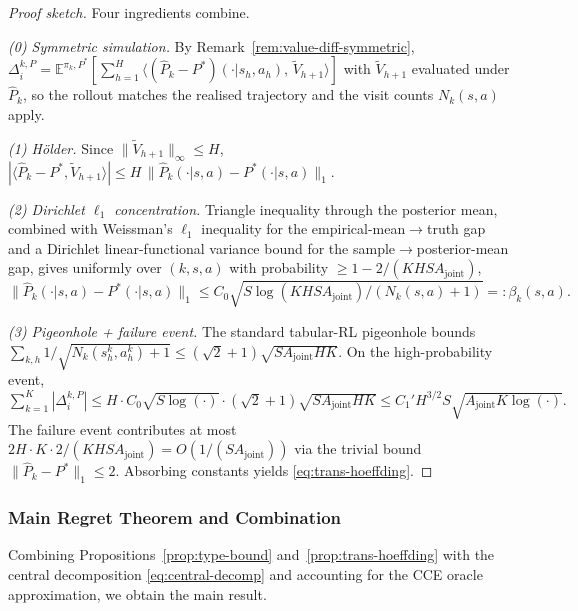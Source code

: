 \begin{proof}[Proof sketch]
Four ingredients combine.

\emph{(0) Symmetric simulation.} By Remark~\ref{rem:value-diff-symmetric}, $\Delta_i^{k,P} = \mathbb{E}^{\pi_k,P^*}[\sum_{h=1}^H \langle(\hat P_k - P^*)(\cdot|s_h,a_h),\,\widetilde V_{h+1}\rangle]$ with $\widetilde V_{h+1}$ evaluated under $\hat P_k$, so the rollout matches the realised trajectory and the visit counts $N_k(s,a)$ apply.

\emph{(1) H\"older.} Since $\|\widetilde V_{h+1}\|_\infty\le H$, $|\langle\hat P_k-P^*,\widetilde V_{h+1}\rangle|\le H\,\|\hat P_k(\cdot|s,a)-P^*(\cdot|s,a)\|_1$.

\emph{(2) Dirichlet $\ell_1$ concentration.} Triangle inequality through the posterior mean, combined with Weissman's $\ell_1$ inequality \citep{weissman2003inequalities} for the empirical-mean$\to$truth gap and a Dirichlet linear-functional variance bound for the sample$\to$posterior-mean gap, gives uniformly over $(k,s,a)$ with probability $\ge 1-2/(KHSA_{\mathrm{joint}})$,
$\|\hat P_k(\cdot|s,a)-P^*(\cdot|s,a)\|_1 \le C_0\sqrt{S\log(KHSA_{\mathrm{joint}})/(N_k(s,a)+1)} =: \beta_k(s,a).$

\emph{(3) Pigeonhole + failure event.} The standard tabular-RL pigeonhole \citep[Lemma~19]{jaksch2010near} bounds $\sum_{k,h}1/\sqrt{N_k(s_h^k,a_h^k)+1} \le (\sqrt{2}+1)\sqrt{SA_{\mathrm{joint}}HK}$. On the high-probability event,
$\sum_{k=1}^K |\Delta_i^{k,P}| \le H\cdot C_0\sqrt{S\log(\cdot)}\cdot(\sqrt{2}+1)\sqrt{SA_{\mathrm{joint}}HK} \le C_1' H^{3/2}S\sqrt{A_{\mathrm{joint}}K\log(\cdot)}.$
The failure event contributes at most $2H\cdot K\cdot 2/(KHSA_{\mathrm{joint}}) = O(1/(SA_{\mathrm{joint}}))$ via the trivial bound $\|\hat P_k-P^*\|_1\le 2$. Absorbing constants yields \eqref{eq:trans-hoeffding}.
\end{proof}
\subsubsection{Main Regret Theorem and Combination}

Combining Propositions~\ref{prop:type-bound} and~\ref{prop:trans-hoeffding} with the central decomposition \eqref{eq:central-decomp} and accounting for the CCE oracle approximation, we obtain the main result.

